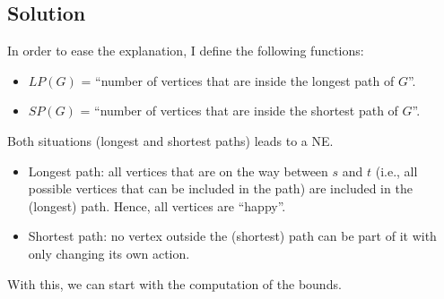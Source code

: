 \documentclass[a4paper, 11pt]{article}
\begin{document}
\subsection*{Solution}
In order to ease the explanation, I define the following functions:
\begin{itemize}
    \item $LP(G)$ = ``number of vertices that are inside the longest path of $G$''.
    \item $SP(G)$ = ``number of vertices that are inside the shortest path of $G$''.
\end{itemize}
Both situations (longest and shortest paths) leads to a NE.
\begin{itemize}
    \item Longest path: all vertices that are on the way between $s$ and $t$ (i.e., all possible vertices that can be included in the path) are included in the (longest) path. Hence, all vertices are ``happy''.
    \item Shortest path: no vertex outside the (shortest) path can be part of it with only changing its own action.
\end{itemize}
With this, we can start with the computation of the bounds.
\end{document}
